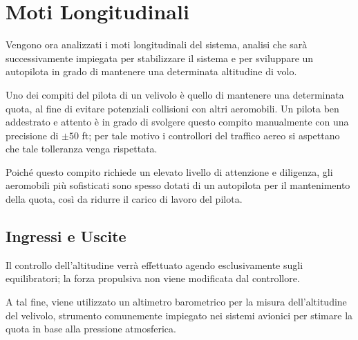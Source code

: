 \section{Moti Longitudinali}
Vengono ora analizzati i moti longitudinali del sistema, analisi che sarà successivamente impiegata per stabilizzare il sistema e per sviluppare un autopilota in grado di mantenere una determinata altitudine di volo.

Uno dei compiti del pilota di un velivolo è quello di mantenere una determinata quota, al fine di evitare potenziali collisioni con altri aeromobili.
Un pilota ben addestrato e attento è in grado di svolgere questo compito manualmente con una precisione di $\pm 50$ ft; per tale motivo i controllori del traffico aereo si aspettano che tale tolleranza venga rispettata.

Poiché questo compito richiede un elevato livello di attenzione e diligenza, gli aeromobili più sofisticati sono spesso dotati di un autopilota per il mantenimento della quota, così da ridurre il carico di lavoro del pilota.

\subsection{Ingressi e Uscite}

Il controllo dell'altitudine verrà effettuato agendo esclusivamente sugli equilibratori; la forza propulsiva non viene modificata dal controllore.

A tal fine, viene utilizzato un altimetro barometrico per la misura dell'altitudine del velivolo, strumento comunemente impiegato nei sistemi avionici per stimare la quota in base alla pressione atmosferica.

